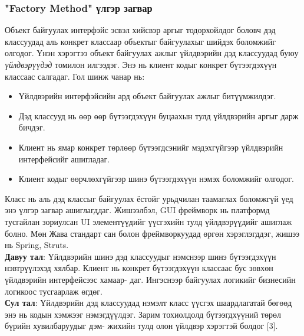 \subsubsection{"Factory Method" үлгэр загвар}
\quad \quad Объект байгуулах интерфэйс эсвэл хийсвэр аргыг тодорхойлдог боловч дэд классуудад аль конкрет классаар объектыг байгуулахыг шийдэх боломжийг олгодог. Үнэн хэрэгтээ объект байгуулах ажлыг үйлдвэрийн дэд классуудад буюу \textit{үйлдвэрүүдэд} томилон илгээдэг. Энэ нь клиент кодыг конкрет бүтээгдэхүүн классаас салгадаг. Гол шинж чанар нь:
\begin{itemize}
	\item Үйлдвэрийн интерфэйсийн ард объект байгуулах ажлыг битүүмжилдэг.
	\item Дэд классууд нь өөр өөр бүтээгдэхүүн буцаахын тулд үйлдвэрийн аргыг дарж бичдэг.
	\item Клиент нь ямар конкрет төрлөөр бүтээгдсэнийг мэдэхгүйгээр үйлдвэрийн интерфейсийг ашигладаг.
	\item Клиент кодыг өөрчлөхгүйгээр шинэ бүтээгдэхүүн нэмэх боломжийг олгодог.
\end{itemize}
Класс нь аль дэд классыг байгуулах ёстойг урьдчилан таамаглах боломжгүй үед энэ үлгэр загвар ашиглагддаг. Жишээлбэл, GUI фреймворк нь платформд тусгайлан зориулсан UI элементүүдийг үүсгэхийн тулд үйлдвэрүүдийг ашиглаж болно. Мөн Жава стандарт сан болон фреймворкуудад өргөн хэрэглэгддэг, жишээ нь Spring, Struts.\\
\textbf{Давуу тал}: Үйлдвэрийн шинэ дэд классуудыг нэмснээр шинэ бүтээгдэхүүн нэвтрүүлэхэд хялбар. Клиент нь конкрет бүтээгдэхүүн классаас бус зөвхөн үйлдвэрийн интерфейсээс хамаар- даг. Ингэснээр байгуулах логикийг бизнесийн логикоос тусгаарлаж өгдөг.\\
\textbf{Сул тал}: Үйлдвэрийн дэд классуудад нэмэлт класс үүсгэх шаардлагатай бөгөөд энэ нь кодын хэмжээг нэмэгдүүлдэг. Зарим тохиолдолд бүтээгдхүүний төрөл бүрийн хувилбаруудыг дэм- жихийн тулд олон үйлдвэр хэрэгтэй болдог [3].

